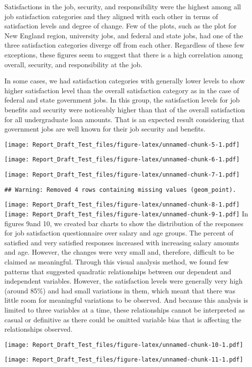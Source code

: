 \documentclass[]{article}
\begin{document}
Satisfactions in the job, security, and responsibility were the highest
among all job satisfaction categories and they aligned with each other
in terms of satisfaction levels and degree of change. Few of the plots,
such as the plot for New England region, university jobs, and federal
and state jobs, had one of the three satisfaction categories diverge off
from each other. Regardless of these few exceptions, these figures seem
to suggest that there is a high correlation among overall, security, and
responsibility at the job.

In some cases, we had satisfaction categories with generally lower
levels to show higher satisfaction level than the overall satisfaction
category as in the case of federal and state government jobs. In this
group, the satisfaction levels for job benefits and security were
noticeably higher than that of the overall satisfaction for all
undergraduate loan amounts. That is an expected result considering that
government jobs are well known for their job security and benefits.

\texttt{[image: Report\_Draft\_Test\_files/figure-latex/unnamed-chunk-5-1.pdf]}

\texttt{[image: Report\_Draft\_Test\_files/figure-latex/unnamed-chunk-6-1.pdf]}

\texttt{[image: Report\_Draft\_Test\_files/figure-latex/unnamed-chunk-7-1.pdf]}

\begin{verbatim}
## Warning: Removed 4 rows containing missing values (geom_point).
\end{verbatim}

\texttt{[image: Report\_Draft\_Test\_files/figure-latex/unnamed-chunk-8-1.pdf]}
\texttt{[image: Report\_Draft\_Test\_files/figure-latex/unnamed-chunk-9-1.pdf]}
In figures 9and 10, we created bar charts to show the distribution of
the responses for job satisfaction questionnaire over salary and age
groups. The percent of satisfied and very satisfied responses increased
with increasing salary amounts and age. However, the changes were very
small and, therefore, difficult to be claimed as meaningful. Through
this visual analysis method, we found few patterns that suggested
quadratic relationships between our dependent and independent variables.
However, the satisfaction levels were generally very high (around 85\%)
and had small variations in them, which meant that there was little room
for meaningful variations to be observed. And because this analysis is
limited to three variables at a time, these relationships cannot be
interpreted as casual or definitive as there could be omitted variable
bias that is affecting the relationships observed.

\texttt{[image: Report\_Draft\_Test\_files/figure-latex/unnamed-chunk-10-1.pdf]}

\texttt{[image: Report\_Draft\_Test\_files/figure-latex/unnamed-chunk-11-1.pdf]}
\end{document}
